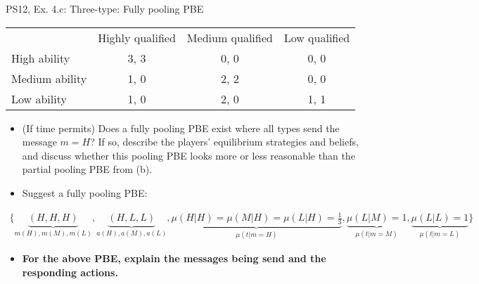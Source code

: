 \begin{frame}{PS12, Ex. 4.c: Three-type: Fully pooling PBE}
    \begin{table}
      \begin{tabular}{l|c|c|c|}
          \multicolumn{1}{c}{} & \multicolumn{1}{c}{Highly qualified} & \multicolumn{1}{c}{Medium qualified} & \multicolumn{1}{c}{Low qualified} \\\cline{2-4}
          High ability   & 3, 3 & 0, 0 & 0, 0 \\\cline{2-4}
          Medium ability & 1, 0 & 2, 2 & 0, 0 \\\cline{2-4}
          Low ability    & 1, 0 & 2, 0 & 1, 1 \\\cline{2-4}
      \end{tabular}
    \end{table}\vspace{-8pt}
    \begin{itemize}
      \item[(c)] (If time permits) Does a fully pooling PBE exist where all types send the message $m = H$? If so, describe the players’ equilibrium strategies and beliefs, and discuss whether this pooling PBE looks more or less reasonable than the partial pooling PBE from (b).
      \item[Step 1:] Suggest a fully pooling PBE:
    \end{itemize}\vspace{-12pt}
    \begin{align*}
      \{\underbrace{(H,H,H)}_{m(H),m(M),m(L)},\underbrace{(H,L,L)}_{a(H),a(M),a(L)},\underbrace{\mu(H|H)=\mu(M|H)=\mu(L|H)=\frac{1}{3}}_{\mu(t|m=H)},\underbrace{\mu(L|M)=1}_{\mu(t|m=M)},\underbrace{\mu(L|L)=1}_{\mu(t|m=L)}\}
    \end{align*}\vspace{-14pt}
    \begin{itemize}
        \item[Step 2:] \textbf{For the above PBE, explain the messages being send and the responding actions.}
    \end{itemize}\vspace{-2pt}
\end{frame}
